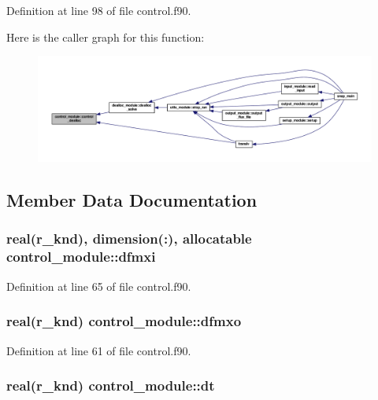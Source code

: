 Definition at line 98 of file control.\-f90.



Here is the caller graph for this function\-:\nopagebreak
\begin{figure}[H]
\begin{center}
\leavevmode
\includegraphics[width=350pt]{classcontrol__module_a2f968e7fae2c9dab97d81d4e8db154c8_icgraph}
\end{center}
\end{figure}




\subsection{Member Data Documentation}
\hypertarget{classcontrol__module_a39abfd20b09ff5ed5e22b69c92038156}{
\subsubsection[{dfmxi}]{\setlength{\rightskip}{0pt plus 5cm}real(r\-\_\-knd), dimension(\-:), allocatable control\-\_\-module\-::dfmxi}}\label{classcontrol__module_a39abfd20b09ff5ed5e22b69c92038156}


Definition at line 65 of file control.\-f90.

\hypertarget{classcontrol__module_a53a34dce98c72051d0043743774ea209}{
\subsubsection[{dfmxo}]{\setlength{\rightskip}{0pt plus 5cm}real(r\-\_\-knd) control\-\_\-module\-::dfmxo}}\label{classcontrol__module_a53a34dce98c72051d0043743774ea209}


Definition at line 61 of file control.\-f90.

\hypertarget{classcontrol__module_af466573cb3712b4a00c930a1720eeb68}{
\subsubsection[{dt}]{\setlength{\rightskip}{0pt plus 5cm}real(r\-\_\-knd) control\-\_\-module\-::dt}}\label{classcontrol__module_af466573cb3712b4a00c930a1720eeb68}


